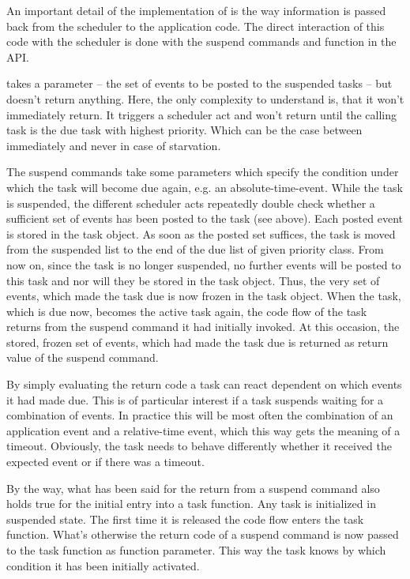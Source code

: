 An important detail of the implementation of \rtos{} is the way
information is passed back from the scheduler to the application code. The
direct interaction of this code with the scheduler is done with the
suspend commands and function  in the \rtos{} API.

 takes a parameter -- the set of events to be posted to
the suspended tasks -- but doesn't return anything. Here, the only
complexity to understand is, that it won't immediately return. It triggers
a scheduler act and won't return until the calling task is the due task
with highest priority. Which can be the case between immediately and never
in case of starvation.

The suspend commands take some parameters which specify the condition
under which the task will become due again, e.g. an absolute-time-event.
While the task is suspended, the different scheduler acts repeatedly double
check whether a sufficient set of events has been posted to the task (see
above). Each posted event is stored in the task object. As soon as the
posted set suffices, the task is moved from the suspended list to the end
of the due list of given priority class. From now on, since the task is no
longer suspended, no further events will be posted to this task and nor
will they be stored in the task object. Thus, the very set of events, which
made the task due is now frozen in the task object. When the task, which
is due now, becomes the active task again, the code flow of the task
returns from the suspend command it had initially invoked. At this
occasion, the stored, frozen set of events, which had made the task due is
returned as return value of the suspend command.

By simply evaluating the return code a task can react dependent on which
events it had made due. This is of particular interest if a task suspends
waiting for a combination of events. In practice this will be most often
the combination of an application event and a relative-time event, which
this way gets the meaning of a timeout. Obviously, the task needs to
behave differently whether it received the expected event or if there was
a timeout.

By the way, what has been said for the return from a suspend command also
holds true for the initial entry into a task function. Any task is
initialized in suspended state. The first time it is released the code
flow enters the task function. What's otherwise the return code of a
suspend command is now passed to the task function as function parameter.
This way the task knows by which condition it has been initially
activated.

